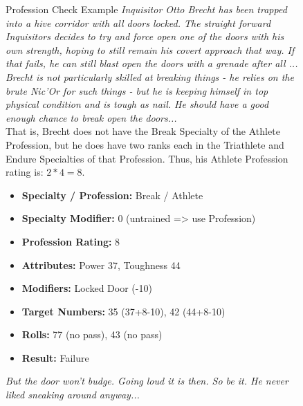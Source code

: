 \begin{figure}[hb]
	\begin{DndSidebar}{Profession Check Example}
	\textit{Inquisitor Otto Brecht has been trapped into a hive corridor with all doors locked. The straight forward Inquisitors decides to try and force open one of the doors with his own strength, hoping to still remain his covert approach that way. If that fails, he can still blast open the doors with a grenade after all ...\\
	Brecht is not particularly skilled at breaking things - he relies on the brute Nic'Or for such things - but he is keeping himself in top physical condition and is tough as nail. He should have a good enough chance to break open the doors...}\\
	That is, Brecht does not have the Break Specialty of the Athlete Profession, but he does have two ranks each in the Triathlete and Endure Specialties of that Profession. Thus, his Athlete Profession rating is: $2*4=8$.
		\begin{itemize}
		\item \textbf{Specialty / Profession:} Break / Athlete
		\item \textbf{Specialty Modifier:} 0 (untrained => use Profession)
		\item \textbf{Profession Rating:} 8
		\item \textbf{Attributes:} Power 37, Toughness 44
		\item \textbf{Modifiers:} Locked Door (-10)
		\item \textbf{Target Numbers:} 35 (37+8-10), 42 (44+8-10)
		\item \textbf{Rolls:} 77 (no pass), 43 (no pass)
		\item \textbf{Result:} Failure
	\end{itemize}
	\textit{But the door won't budge. Going loud it is then. So be it. He never liked sneaking around anyway...}
	\end{DndSidebar}
\end{figure}

